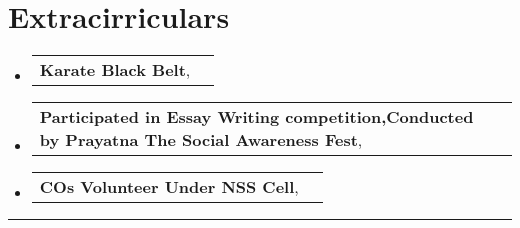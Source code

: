 \documentclass[a4paper,11pt]{article}
\makeatletter
\newcommand{\resumePOR}[3]{
\vspace{0.5mm}\item
    \begin{tabular*}{0.97\textwidth}[t]{l@{\extracolsep{\fill}}r}
        \textbf{#1},\hspace{0.3mm}#2 & \textit{\small{#3}} 
    \end{tabular*}
    \vspace{-2mm}
}
\newcommand{\resumeSubHeadingListStart}{\begin{itemize}[leftmargin=*,labelsep=0mm]}
\newcommand{\resumeSubHeadingListEnd}{\end{itemize}\vspace{2mm}}
\makeatother
\begin{document}
    \section{Extracirriculars}
\vspace{-0.2mm}
\resumeSubHeadingListStart
\resumePOR{Karate Black Belt} %
    { } %
    {} %
\resumePOR{Participated in Essay Writing competition,Conducted by Prayatna The Social Awareness Fest} %
    { } %
    {} %
\resumePOR{COs Volunteer Under NSS Cell} %
    { } %
    {} %

\resumeSubHeadingListEnd
\hspace*{-5mm}\rule{1.035\textwidth}{0.1mm}


\end{document}
